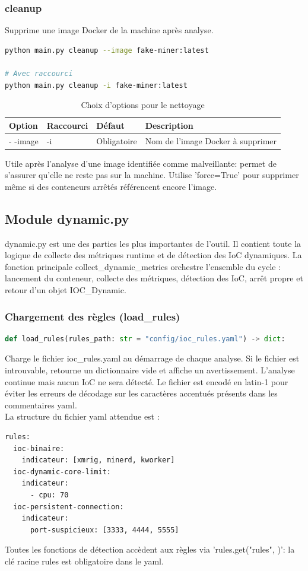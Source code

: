 \subsubsection{cleanup}
Supprime une image Docker de la machine après analyse.
\begin{lstlisting}[language=bash, caption=commande nettoyage]
python main.py cleanup --image fake-miner:latest

# Avec raccourci
python main.py cleanup -i fake-miner:latest
\end{lstlisting}
\begin{table}[H]
    \centering
    \begin{tabularx}{\textwidth}{|l|l|l|X|}
        \hline
        \textbf{Option} & \textbf{Raccourci} & \textbf{Défaut} & \textbf{Description} \\
        \hline
        - -image & -i & Obligatoire & Nom de l'image Docker à supprimer \\
        \hline
    \end{tabularx}
    \caption{Choix d'options pour le nettoyage}
\end{table}
Utile après l'analyse d'une image identifiée comme malveillante: permet de s'assurer qu'elle ne reste pas sur la machine. Utilise 'force=True' pour supprimer même si des conteneurs arrêtés référencent encore l'image. \\
\subsection{Module dynamic.py}
dynamic.py est une des parties les plus importantes de l'outil. Il contient toute la logique de collecte des métriques runtime et de détection des IoC dynamiques. La fonction principale collect\_dynamic\_metrics orchestre l'ensemble du cycle : lancement du conteneur, collecte des métriques, détection des IoC, arrêt propre et retour d'un objet IOC\_Dynamic. \\
\subsubsection{Chargement des règles (load\_rules)}
\begin{lstlisting}[language=python, caption=programme de chargement des règles]
def load_rules(rules_path: str = "config/ioc_rules.yaml") -> dict:
\end{lstlisting}
Charge le fichier ioc\_rules.yaml au démarrage de chaque analyse. Si le fichier est introuvable, retourne un dictionnaire vide et affiche un avertissement. L'analyse continue mais aucun IoC ne sera détecté. Le fichier est encodé en latin-1 pour éviter les erreurs de décodage sur les caractères accentués présents dans les commentaires yaml. \\
La structure du fichier yaml attendue est :
\begin{lstlisting}[language=bash, caption=Structure fichier yaml]
rules:
  ioc-binaire:
    indicateur: [xmrig, minerd, kworker]
  ioc-dynamic-core-limit:
    indicateur:
      - cpu: 70
  ioc-persistent-connection:
    indicateur:
      port-suspicieux: [3333, 4444, 5555]
\end{lstlisting}
Toutes les fonctions de détection accèdent aux règles via 'rules.get("rules", {})': la clé racine rules est obligatoire dans le yaml.
